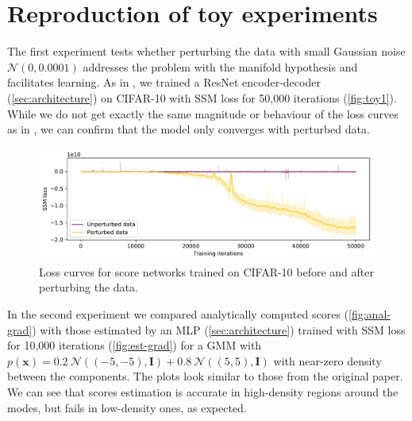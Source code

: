 \section{Reproduction of toy experiments}
\label{sec:repr-of-toy}


The first experiment tests whether perturbing the data with small Gaussian noise $\mathcal{N}(0, 0.0001)$ addresses the problem with the manifold hypothesis and facilitates learning. %
As in \citep{ncsn-paper}, we trained a ResNet encoder-decoder (\autoref{sec:architecture}) on CIFAR-10 with SSM loss for 50,000 iterations (\autoref{fig:toy1}). While we do not get exactly the same magnitude or behaviour of the loss curves as in \cite{ncsn-paper}, we can confirm that the model only converges with perturbed data.%

\begin{figure}[h]
  \centering
  \includegraphics[width=0.83\linewidth]{figures/toy/loss_toy.pdf}
     \caption{Loss curves for score networks trained on
     CIFAR-10 before and after perturbing the data.}
     \label{fig:toy1}
     \vspace{-3mm}
\end{figure}

In the second experiment we compared analytically computed scores (\autoref{fig:anal-grad}) with those estimated by an MLP (\autoref{sec:architecture}) trained with SSM loss for 10,000 iterations (\autoref{fig:est-grad}) for a GMM with $p(\mathbf{x}) = 0.2\ \mathcal{N}\left((-5, -5), \mathbf{I}\right) + 0.8\ \mathcal{N}\left((5, 5), \mathbf{I}\right)$ with near-zero density between the components. The plots look similar to those from the original paper. We can see that scores estimation is accurate in high-density regions around the modes, but fails in low-density ones, as expected.

